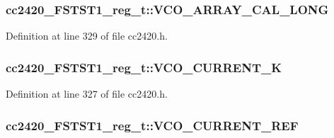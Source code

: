\subsubsection[{\texorpdfstring{V\+C\+O\+\_\+\+A\+R\+R\+A\+Y\+\_\+\+C\+A\+L\+\_\+\+L\+O\+NG}{VCO_ARRAY_CAL_LONG}}]{ cc2420\+\_\+\+F\+S\+T\+S\+T1\+\_\+reg\+\_\+t\+::\+V\+C\+O\+\_\+\+A\+R\+R\+A\+Y\+\_\+\+C\+A\+L\+\_\+\+L\+O\+NG}\hypertarget{structcc2420___f_s_t_s_t1__reg__t_a4ed772c52c44810879c0fc6b5431550d}{}\label{structcc2420___f_s_t_s_t1__reg__t_a4ed772c52c44810879c0fc6b5431550d}


Definition at line 329 of file cc2420.\+h.

\subsubsection[{\texorpdfstring{V\+C\+O\+\_\+\+C\+U\+R\+R\+E\+N\+T\+\_\+K}{VCO_CURRENT_K}}]{ cc2420\+\_\+\+F\+S\+T\+S\+T1\+\_\+reg\+\_\+t\+::\+V\+C\+O\+\_\+\+C\+U\+R\+R\+E\+N\+T\+\_\+K}\hypertarget{structcc2420___f_s_t_s_t1__reg__t_aae4417ede6f2b108e3062fbeff19e1d0}{}\label{structcc2420___f_s_t_s_t1__reg__t_aae4417ede6f2b108e3062fbeff19e1d0}


Definition at line 327 of file cc2420.\+h.

\subsubsection[{\texorpdfstring{V\+C\+O\+\_\+\+C\+U\+R\+R\+E\+N\+T\+\_\+\+R\+EF}{VCO_CURRENT_REF}}]{ cc2420\+\_\+\+F\+S\+T\+S\+T1\+\_\+reg\+\_\+t\+::\+V\+C\+O\+\_\+\+C\+U\+R\+R\+E\+N\+T\+\_\+\+R\+EF}\hypertarget{structcc2420___f_s_t_s_t1__reg__t_af33974d1624ee75478244639af29d303}{}\label{structcc2420___f_s_t_s_t1__reg__t_af33974d1624ee75478244639af29d303}


